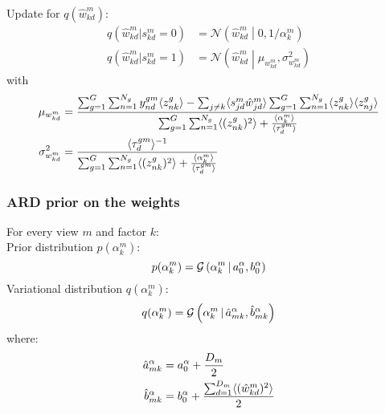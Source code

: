 Update for $q(\hat{w}_{kd}^m)$:
\begin{equation} \begin{aligned}
      q(\hat{w}_{kd}^m|s_{kd}^m=0) &= \mathcal{N} \left(\hat{w}_{kd}^m \middle| 0, 1/\alpha_k^m \right) \\
      q(\hat{w}_{kd}^m|s_{kd}^m=1) &= \mathcal{N} \left( \hat{w}_{kd}^m \middle| \mu_{w_{kd}^m}, \sigma_{w_{kd}^m}^2\right)
  \end{aligned} \end{equation}
with
\begin{equation} \begin{aligned}
  	\mu_{w_{kd}^m} &= \frac{ \sum_{g=1}^G\sum_{n=1}^{N_g} y_{nd}^{gm} \langle z^g_{nk} \rangle - \sum_{j \neq k} \langle s_{jd}^m\hat{w}_{jd}^m \rangle \sum_{g=1}^G\sum_{n=1}^{N_g} \langle z^g_{nk} \rangle \langle z^g_{nj} \rangle } { \sum_{g=1}^G\sum_{n=1}^{N_g} \langle (z_{nk}^g)^2 \rangle + \frac{\langle\alpha_k^m\rangle}{\langle\tau_d^{gm}\rangle} }\\
  	\sigma_{w_{kd}^m}^2 &= \frac{ \langle\tau_d^{gm}\rangle^{-1} } { \sum_{g=1}^G\sum_{n=1}^{N_g} \langle (z_{nk}^g)^2 \rangle + \frac{\langle\alpha_k^m\rangle}{\langle\tau_d^{gm}\rangle} }
\end{aligned} \end{equation}



\subsubsection*{ARD prior on the weights}

For every view $m$ and factor $k$: \\

Prior distribution $p(\alpha_k^m)$:
\[
	p(\alpha_k^m) = \mathcal{G}\left(\alpha_k^m \,|\, a_0^\alpha, b_0^\alpha\right)
\]
Variational distribution $q(\alpha_k^m)$:
\begin{equation}
    q(\alpha^m_{k}) = \mathcal{G}\left(\alpha_k^m \,|\, \hat{a}_{mk}^{\alpha}, \hat{b}_{mk}^{\alpha}\right)
\end{equation}
where:
\begin{equation} \begin{aligned}
	\hat{a}_{mk}^\alpha &= a_0^\alpha + \frac{D_m}{2}\\
	\hat{b}_{mk}^\alpha &= b_0^\alpha +\frac{ \sum_{d=1}^{D_m} \langle (\hat{w}_{kd}^m)^2 \rangle }{2}
\end{aligned} \end{equation}


